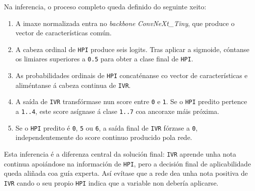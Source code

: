Na inferencia, o proceso completo queda definido do seguinte xeito:

\begin{enumerate}
    \item A imaxe normalizada entra no \textit{backbone} \textit{ConvNeXt\_Tiny}, que produce o vector
    de características común.
    \item A cabeza ordinal de \texttt{HPI} produce seis logits. Tras aplicar a sigmoide, cóntanse os
    limiares superiores a \texttt{0.5} para obter a clase final de \texttt{HPI}.
    \item As probabilidades ordinais de \texttt{HPI} concaténanse co vector de características e
    aliméntanse á cabeza continua de \texttt{IVR}.
    \item A saída de \texttt{IVR} transfórmase nun score entre \texttt{0} e \texttt{1}. Se o
    \texttt{HPI} predito pertence a \texttt{1..4}, este score asígnase á clase \texttt{1..7} coa
    ancoraxe máis próxima.
    \item Se o \texttt{HPI} predito é \texttt{0}, \texttt{5} ou \texttt{6}, a saída final de
    \texttt{IVR} fórzase a \texttt{0}, independentemente do score continuo producido pola rede.
\end{enumerate}

Esta inferencia é a diferenza central da solución final: \texttt{IVR} aprende unha nota continua
apoiándose na información de \texttt{HPI}, pero a decisión final de aplicabilidade queda aliñada coa
guía experta. Así evítase que a rede dea unha nota positiva de \texttt{IVR} cando o seu propio
\texttt{HPI} indica que a variable non debería aplicarse.

